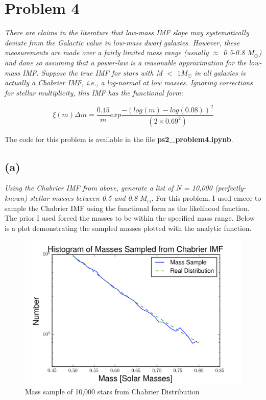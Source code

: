 \documentclass[english,11pt]{article}
\begin{document}
\section*{Problem 4}
\textit{There are claims in the literature that low-mass IMF slope may systematically deviate from the Galactic value in low-mass dwarf galaxies. However, these measurements are made over a fairly limited mass range (usually $\approx$ 0.5-0.8 $M_{\odot}$) and done so assuming that a power-law is a reasonable approximation for the low-mass IMF.
Suppose the true IMF for stars with M $<$ $1 M_{\odot}$ in all galaxies is actually a Chabrier IMF, i.e., a log-normal at low masses. Ignoring corrections for stellar multiplicity, this IMF has the functional form:}

\begin{equation}
\xi (m) \Delta m = \frac{0.15}{m}exp \frac{-(log(m) - log(0.08))^2}{(2 \times 0.69^2)}
\end{equation}

The code for this problem is available in the file \textbf{ps2\_problem4.ipynb}.
\subsection*{(a)}
\textit{Using the Chabrier IMF from above, generate a list of N = 10,000 (perfectly-known) stellar masses between 0.5 and 0.8 $M_{\odot}$.}
For this problem, I used emcee to sample the Chabrier IMF using the functional form as the likelihood function. The prior I used forced the masses to be within the specified mass range.
Below is a plot demonstrating the sampled masses plotted with the analytic function.

\begin{figure}[H]
\centering
\caption{Mass sample of 10,000 stars from Chabrier Distribution}
\includegraphics[scale = 0.6]{histogram_of_masses_chabrier_prob4.png}
\end{figure}
\end{document}
